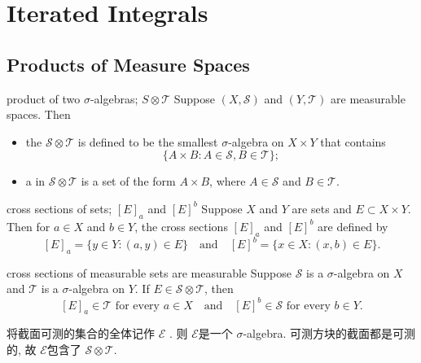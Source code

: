 \documentclass[../main.tex]{subfiles}
\begin{document}
\ifSubfilesClassLoaded{

    \tableofcontents
    
}{}

\chapter{ Iterated Integrals }

\section{Products of Measure Spaces}
\begin{definition}{product of two $\sigma$-algebras; $S \otimes \mathcal{T}$}{}
Suppose $(X,\mathcal{S})$ and $(Y,\mathcal{T})$ are measurable spaces. Then
\begin{itemize}
  \item the  $\mathcal{S} \otimes \mathcal{T}$ is defined to be the smallest $\sigma$-algebra on $X \times Y$ that contains
  \[
  \{A \times B : A \in \mathcal{S}, B \in \mathcal{T}\};
  \]
  \item a  in $\mathcal{S} \otimes \mathcal{T}$ is a set of the form $A \times B$, where $A \in \mathcal{S}$ and $B \in \mathcal{T}$.
\end{itemize}
\end{definition}
\begin{definition}{cross sections of sets; \([E]_a\) and \([E]^b\)}{}
Suppose \(X\) and \(Y\) are sets and \(E \subset X \times Y\). Then for \(a \in X\) and \(b \in Y\), the cross sections \([E]_a\) and \([E]^b\) are defined by
\[
[E]_a = \{y \in Y : (a,y) \in E\} \quad \text{and} \quad [E]^b = \{x \in X : (x,b) \in E\}.
\]
\end{definition}

\begin{proposition}{cross sections of measurable sets are measurable}{}
Suppose \(\mathcal{S}\) is a \(\sigma\)-algebra on \(X\) and \(\mathcal{T}\) is a \(\sigma\)-algebra on \(Y\). If \(E \in \mathcal{S} \otimes \mathcal{T}\), then 
\[
[E]_a \in \mathcal{T} \text{ for every } a \in X \quad \text{and} \quad [E]^b \in \mathcal{S} \text{ for every } b \in Y.
\]
\end{proposition}

\begin{proofsketch}
  将截面可测的集合的全体记作 \(  \mathcal{E}  \) . 则 \(  \mathcal{E}  \)是一个 \(   \sigma   \)-algebra.    可测方块的截面都是可测的, 故 \(  \mathcal{E}  \)包含了 \(  \mathcal{S}\otimes \mathcal{T}  \).  
\end{proofsketch}
\end{document}

